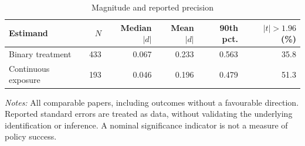 \begin{table}[htbp]\centering\small
\caption{Magnitude and reported precision}\label{tab:distribution}
\setlength{\tabcolsep}{4pt}
\begin{tabular}{lrrrrr}\toprule
Estimand & $N$ & Median $|d|$ & Mean $|d|$ & 90th pct. & $|t|>1.96$ (\%) \\
\midrule
Binary treatment & 433 & 0.067 & 0.233 & 0.563 & 35.8 \\
Continuous exposure & 193 & 0.046 & 0.196 & 0.479 & 51.3 \\
\bottomrule\end{tabular}
\par\vspace{4pt}\begin{minipage}{\textwidth}\footnotesize
\textit{Notes:} All comparable papers, including outcomes without a favourable direction. Reported standard errors are treated as data, without validating the underlying identification or inference. A nominal significance indicator is not a measure of policy success.
\end{minipage}
\end{table}
